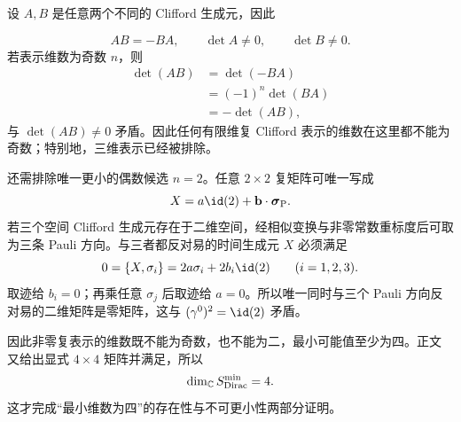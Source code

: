 \begin{derivation}
设 $A,B$ 是任意两个不同的 Clifford 生成元，因此

\begin{equation*}
 AB=-BA,
 \qquad
 \det A\neq0,
 \qquad
 \det B\neq0.
\end{equation*}
若表示维数为奇数 $n$，则
\begin{align*}
 \det(AB)
 &=\det(-BA)\\
 &=(-1)^n\det(BA)\\
 &=-\det(AB),
\end{align*}
与 $\det(AB)\neq0$ 矛盾。因此任何有限维复 Clifford 表示的维数在这里都不能为奇数；特别地，三维表示已经被排除。

还需排除唯一更小的偶数候选 $n=2$。任意 $2\times2$ 复矩阵可唯一写成
\begin{equation*}
 X=a\id(2)+\mathbf b\cdot\boldsymbol\sigma_{\rm P}.
\end{equation*}
若三个空间 Clifford 生成元存在于二维空间，经相似变换与非零常数重标度后可取为三条 Pauli 方向。与三者都反对易的时间生成元 $X$ 必须满足
\begin{equation*}
 0=\{X,\sigma_i\}
 =2a\sigma_i+2b_i\id(2)
 \qquad(i=1,2,3).
\end{equation*}
取迹给 $b_i=0$；再乘任意 $\sigma_j$ 后取迹给 $a=0$。所以唯一同时与三个 Pauli 方向反对易的二维矩阵是零矩阵，这与 $(\gamma^0)^2=\id(2)$ 矛盾。

因此非零复表示的维数既不能为奇数，也不能为二，最小可能值至少为四。正文 又给出显式 $4\times4$ 矩阵并满足，所以
\begin{equation*}
 \dim_{\mathbb C}S_{\rm Dirac}^{\rm min}=4.
\end{equation*}
这才完成“最小维数为四”的存在性与不可更小性两部分证明。
\end{derivation}



